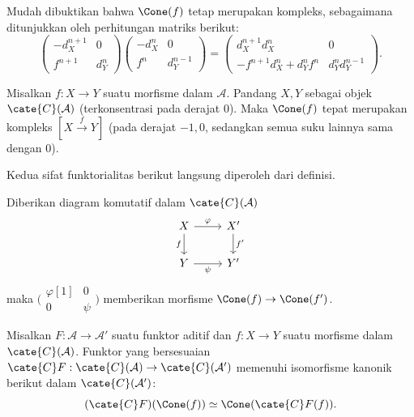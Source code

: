 Mudah dibuktikan bahwa $\Cone(f)$ tetap merupakan kompleks, sebagaimana
ditunjukkan oleh perhitungan matriks berikut:
\[ \begin{pmatrix} -d_X^{n+1} & 0 \\ f^{n+1} & d_Y^n \end{pmatrix} \begin{pmatrix} -d_X^n & 0 \\ f^n & d_Y^{n-1} \end{pmatrix} =
\begin{pmatrix} d_X^{n+1} d_X^n & 0 \\ - f^{n+1} d_X^n + d_Y^n f^n & d_Y^n d_Y^{n-1} \end{pmatrix}. \]

\begin{contoh}
	Misalkan $f:X\to Y$ suatu morfisme dalam $\mathcal{A}$. Pandang $X,Y$
	sebagai objek $\cate{C}(\mathcal{A})$ (terkonsentrasi pada derajat $0$).
	Maka $\Cone(f)$ tepat merupakan kompleks $[X\xrightarrow{f}Y]$ (pada
	derajat $-1,0$, sedangkan semua suku lainnya sama dengan $0$).
\end{contoh}

Kedua sifat funktorialitas berikut langsung diperoleh dari definisi.

\begin{proposisi}\label{prop:cone-functorial}
	Diberikan diagram komutatif dalam $\cate{C}(\mathcal{A})$
	\[\begin{tikzcd}
		X \arrow[d, "f"'] \arrow[r, "\varphi"] & X' \arrow[d, "{f'}"] \\
		Y \arrow[r, "\psi"'] & Y'
	\end{tikzcd}\]
	maka $\bigl(\begin{smallmatrix} \varphi[1] & 0 \\ 0 & \psi \end{smallmatrix}\bigr)$
	memberikan morfisme $\Cone(f)\to\Cone(f')$.
\end{proposisi}

\begin{proposisi}\label{prop:Cone-A}
	Misalkan $F:\mathcal{A}\to\mathcal{A}'$ suatu funktor aditif dan
	$f:X\to Y$ suatu morfisme dalam $\cate{C}(\mathcal{A})$. Funktor yang
	bersesuaian $\cate{C}F:\cate{C}(\mathcal{A})\to
	\cate{C}(\mathcal{A}')$ memenuhi isomorfisme kanonik berikut dalam
	$\cate{C}(\mathcal{A}')$:
	\[ (\cate{C}F)(\Cone(f)) \simeq \Cone(\cate{C}F(f)). \]
\end{proposisi}

